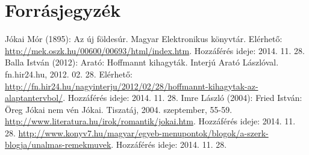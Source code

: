 \documentclass{thesis-ekf}
\begin{document}
    \chapter{Forrásjegyzék}

    Jókai Mór (1895): Az új földesúr. Magyar Elektronikus könyvtár.
        Elérhető: \url{http://mek.oszk.hu/00600/00693/html/index.htm}. Hozzáférés ideje: 2014. 11. 28.
    Balla István (2012): Arató: Hoffmannt kihagyták. Interjú Arató Lászlóval. fn.hir24.hu, 2012. 02. 28.
        Elérhető: \url{http://fn.hir24.hu/nagyinterju/2012/02/28/hoffmannt-kihagytak-az-alaptantervbol/}. Hozzáférés ideje: 2014. 11. 28.
    Imre László (2004): Fried István: Öreg Jókai nem vén Jókai. Tiszatáj, 2004. szeptember, 55-59.
    \url{http://www.literatura.hu/irok/romantik/jokai.htm}. Hozzáférés ideje: 2014. 11. 28.
    \url{http://www.konyv7.hu/magyar/egyeb-menupontok/blogok/a-szerk-blogja/unalmas-remekmuvek}. Hozzáférés ideje: 2014. 11. 28.
\end{document}
